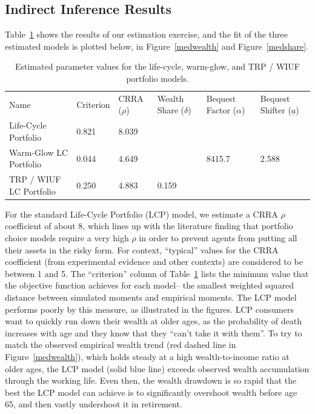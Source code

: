 \documentclass{article}
\newcommand{\CRRA}{\rho}
\begin{document}
\subsection{Indirect Inference Results}

Table~\ref{parameters} shows the results of our estimation exercise, and the fit of the three estimated models is plotted below, in Figure~\ref{medwealth} and Figure~\ref{medshare}.

\begin{table}
\centering
\caption[]{Estimated parameter values for the life-cycle, warm-glow, and TRP / WIUF portfolio models.}
\label{parameters}
\begin{tabular}{p{}p{}p{}p{}p{}p{}}
\toprule
Name & Criterion & CRRA ($\CRRA$) & Wealth Share ($\delta$) & Bequest Factor ($\alpha$) & Bequest Shifter ($\underline{a}$) \\
Life-Cycle Portfolio & 0.821 & 8.039 &  &  &  \\
Warm-Glow LC Portfolio & 0.044 & 4.649 &  & 8415.7 & 2.588 \\
TRP / WIUF LC Portfolio & 0.250 & 4.883 & 0.159 &  &  \\
\bottomrule
\end{tabular}
\end{table}

For the standard Life-Cycle Portfolio (LCP) model, we estimate a CRRA $\CRRA$ coefficient of about 8, which lines up with the literature finding that portfolio choice models require a very high $\CRRA$ in order to prevent agents from putting all their assets in the risky form.
For context, ``typical'' values for the CRRA coefficient (from experimental evidence and other contexts) are considered to be between 1 and 5.
The ``criterion'' column of Table~\ref{parameters} lists the minimum value that the objective function achieves for each model-- the smallest weighted squared distance between simulated moments and empirical moments.
The LCP model performs poorly by this measure, as illustrated in the figures.
LCP consumers want to quickly run down their wealth at older ages, as the probability of death increases with age and they know that they ``can't take it with them''.
To try to match the observed empirical wealth trend (red dashed line in Figure~\ref{medwealth}), which holds steady at a high wealth-to-income ratio at older ages, the LCP model (solid blue line) exceeds observed wealth accumulation through the working life.
Even then, the wealth drawdown is so rapid that the best the LCP model can achieve is to significantly overshoot wealth before age 65, and then vastly undershoot it in retirement.
\end{document}
